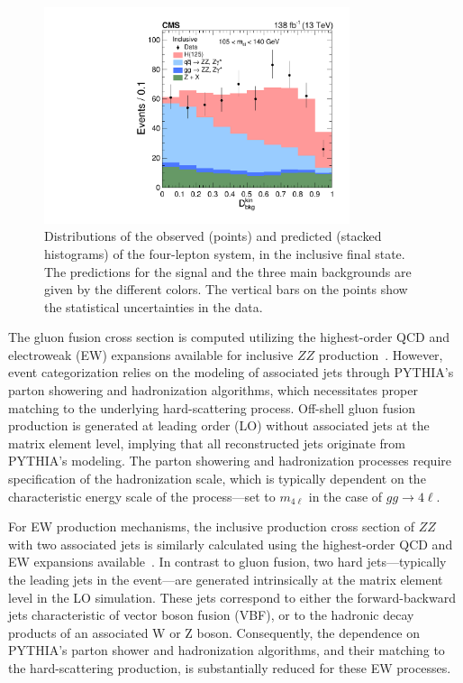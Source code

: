 \begin{figure}[!hbt]
\centering
\includegraphics[width=0.8\textwidth,clip] {figures/Figure_004.pdf}
\caption{Distributions of the observed (points) and predicted (stacked histograms) \Dbkgkin of the four-lepton system, in the inclusive final state. The predictions for the \Hboson signal and the three main backgrounds are given by the different colors.  The vertical bars on the points show the statistical uncertainties in the data.}
\label{fig:DiscDist}
\end{figure}


The gluon fusion cross section is computed utilizing the highest-order QCD and electroweak (EW) expansions available for inclusive $ZZ$ production~\cite{deFlorian:2016spz}. 
However, event categorization relies on the modeling of associated jets through PYTHIA's parton showering and hadronization algorithms, which necessitates proper matching to the underlying hard-scattering process. Off-shell gluon fusion production is generated at leading order (LO) without associated jets at the matrix element level, implying that all reconstructed jets originate from PYTHIA's modeling. 
The parton showering and hadronization processes require specification of the hadronization scale, which is typically dependent on the characteristic energy scale of the process—set to $m_{4\ell}$ in the case of $gg\to 4\ell$.

For EW production mechanisms, the inclusive production cross section of $ZZ$ with two associated jets is similarly calculated using the highest-order QCD and EW expansions available~\cite{deFlorian:2016spz}. 
In contrast to gluon fusion, two hard jets—typically the leading jets in the event—are generated intrinsically at the matrix element level in the LO simulation. 
These jets correspond to either the forward-backward jets characteristic of vector boson fusion (VBF), or to the hadronic decay products of an associated W or Z boson. 
Consequently, the dependence on PYTHIA's parton shower and hadronization algorithms, and their matching to the hard-scattering production, is substantially reduced for these EW processes.


